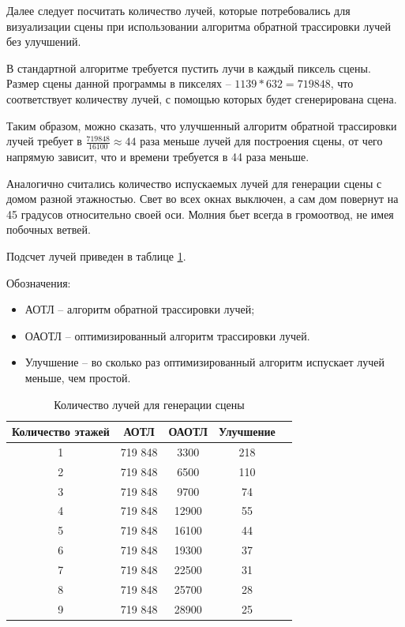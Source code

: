 Далее следует посчитать количество лучей, которые потребовались для визуализации сцены при использовании алгоритма обратной трассировки лучей без улучшений. 

В стандартной алгоритме требуется пустить лучи в каждый пиксель сцены. Размер сцены данной программы в пикселях -- $1139 * 632 = 719 848$, что соответствует количеству лучей, с помощью которых будет сгенерирована сцена.

Таким образом, можно сказать, что улучшенный алгоритм обратной трассировки лучей требует в $\frac{719 848}{16100} \approx 44$ раза меньше лучей для построения сцены, от чего напрямую зависит, что и времени требуется в 44 раза меньше. 

Аналогично считались количество испускаемых лучей для генерации сцены с домом разной этажностью. Свет во всех окнах выключен, а сам дом повернут на 45 градусов относительно своей оси. Молния бьет всегда в громоотвод, не имея побочных ветвей.

Подсчет лучей приведен в таблице \ref{tab:time1}.

Обозначения:
\begin{itemize}
	\item АОТЛ -- алгоритм обратной трассировки лучей;
	\item ОАОТЛ -- оптимизированный алгоритм трассировки лучей.
	\item Улучшение -- во сколько раз оптимизированный алгоритм испускает лучей меньше, чем простой.
\end{itemize}

\begin{table}[h]
	\begin{center}
		\caption{\label{tab:time1}Количество лучей для генерации сцены}
		\begin{tabular}{|c|c|c|c|c|}
			\hline
			Количество этажей & АОТЛ &  ОАОТЛ & Улучшение \\
			\hline
			1  & 719 848 & 3300 & 218 \\
			\hline
			2  & 719 848 & 6500 & 110 \\
			\hline
			3  & 719 848 & 9700 & 74 \\
			\hline
			4  & 719 848 & 12900 & 55 \\
			\hline
			5  & 719 848 & 16100 & 44 \\
			\hline
			6  & 719 848 & 19300 & 37 \\
			\hline
			7  & 719 848 & 22500 & 31 \\
			\hline
			8  & 719 848 & 25700 &  28 \\
			\hline
			9  & 719 848 & 28900 & 25 \\
			\hline
			
		\end{tabular}
	\end{center}
\end{table}


